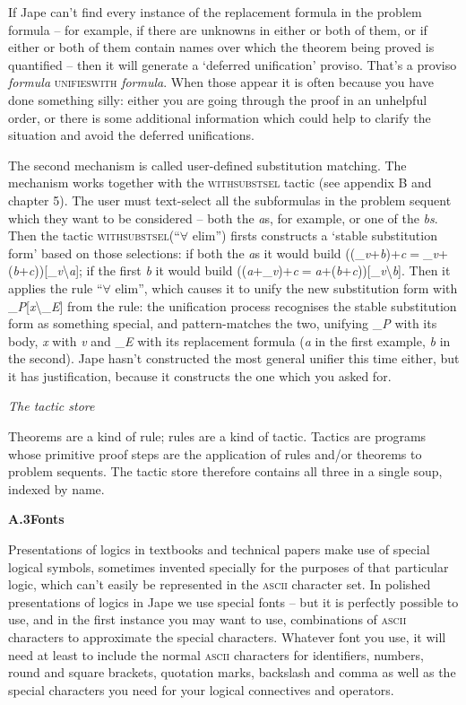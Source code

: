 \documentclass[11pt]{book}
\newcommand{\tab}{\hspace{5mm}}
\begin{document}
If Jape can't find every instance of the replacement formula in the problem formula -- for example, if there are unknowns in either or both of them, or if either or both of them contain names over which the theorem being proved is quantified -- then it will generate a `deferred unification' proviso. That's a proviso \textit{formula} \textsc{unifieswith} \textit{formula}. When those appear it is often because you have done something silly: either you are going through the proof in an unhelpful order, or there is some additional information which could help to clarify the situation and avoid the deferred unifications.


The second mechanism is called user-defined substitution matching. The mechanism works together with the \textsc{withsubstsel} tactic (see appendix B and chapter 5). The user must text-select all the subformulas in the problem sequent which they want to be considered -- both the \textit{a}s, for example, or one of the \textit{bs}. Then the tactic \textsc{withsubstsel}(``\ensuremath{\forall} elim'') firsts constructs a `stable substitution form' based on those selections: if both the \textit{a}s it would build ((\_\textit{v}+\textit{b})+\textit{c}\ensuremath{=}\_\textit{v}+(\textit{b}+\textit{c}))[\_\textit{v}{\textbackslash}\textit{a}]; if the first \textit{b} it would build ((\textit{a}+\_\textit{v})+\textit{c}\ensuremath{=}\textit{a}+(\textit{b}+\textit{c}))[\_\textit{v}{\textbackslash}\textit{b}]. Then it applies the rule ``\ensuremath{\forall} elim'', which causes it to unify the new substitution form with \_\textit{P}[\textit{x}{\textbackslash}\_\textit{E}] from the rule: the unification process recognises the stable substitution form as something special, and pattern-matches the two, unifying \_\textit{P} with its body, \textit{x} with \textit{v} and \_\textit{E} with its replacement formula (\textit{a} in the first example, \textit{b} in the second). Jape hasn't constructed the most general unifier this time either, but it has justification, because it constructs the one which you asked for.


\textit{The tactic store}


Theorems are a kind of rule; rules are a kind of tactic. Tactics are programs whose primitive proof steps are the application of rules and/or theorems to problem sequents. The tactic store therefore contains all three in a single soup, indexed by name.


\textbf{{\large A.3\tab Fonts}}


Presentations of logics in textbooks and technical papers make use of special logical symbols, sometimes invented specially for the purposes of that particular logic, which can't easily be represented in the \textsc{ascii} character set. In polished presentations of logics in Jape we use special fonts -- but it is perfectly possible to use, and in the first instance you may want to use, combinations of \textsc{ascii} characters to approximate the special characters. Whatever font you use, it will need at least to include the normal \textsc{ascii} characters for identifiers, numbers, round and square brackets, quotation marks, backslash and comma as well as the special characters you need for your logical connectives and operators.
\end{document}
